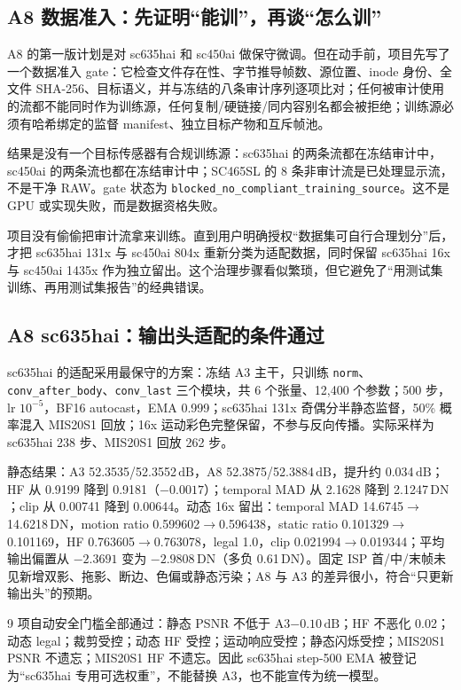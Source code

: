 \documentclass[11pt,a4paper,UTF8,fontset=fandol]{ctexart}
\newcommand{\dn}{\ensuremath{\,\mathrm{DN}}}
\newcommand{\db}{\ensuremath{\,\mathrm{dB}}}
\begin{document}
\subsection{A8 数据准入：先证明“能训”，再谈“怎么训”}

A8 的第一版计划是对 sc635hai 和 sc450ai 做保守微调。但在动手前，项目先写了一个数据准入 gate：它检查文件存在性、字节推导帧数、源位置、inode 身份、全文件 SHA-256、目标语义，并与冻结的八条审计序列逐项比对；任何被审计使用的流都不能同时作为训练源，任何复制/硬链接/同内容别名都会被拒绝；训练源必须有哈希绑定的监督 manifest、独立目标产物和互斥帧池。

结果是没有一个目标传感器有合规训练源：sc635hai 的两条流都在冻结审计中，sc450ai 的两条流也都在冻结审计中；SC465SL 的 8 条非审计流是已处理显示流，不是干净 RAW。gate 状态为 \texttt{blocked\_no\_compliant\_training\_source}。这不是 GPU 或实现失败，而是数据资格失败。

项目没有偷偷把审计流拿来训练。直到用户明确授权“数据集可自行合理划分”后，才把 sc635hai 131x 与 sc450ai 804x 重新分类为适配数据，同时保留 sc635hai 16x 与 sc450ai 1435x 作为独立留出。这个治理步骤看似繁琐，但它避免了“用测试集训练、再用测试集报告”的经典错误。

\subsection{A8 sc635hai：输出头适配的条件通过}

sc635hai 的适配采用最保守的方案：冻结 A3 主干，只训练 \texttt{norm}、\texttt{conv\_after\_body}、\texttt{conv\_last} 三个模块，共 6 个张量、12,400 个参数；500 步，lr $10^{-5}$，BF16 autocast，EMA 0.999；sc635hai 131x 奇偶分半静态监督，50\% 概率混入 MIS20S1 回放；16x 运动彩色完整保留，不参与反向传播。实际采样为 sc635hai 238 步、MIS20S1 回放 262 步。

静态结果：A3 52.3535/52.3552\db，A8 52.3875/52.3884\db，提升约 0.034\db；HF 从 0.9199 降到 0.9181（$-0.0017$）；temporal MAD 从 2.1628 降到 2.1247\dn；clip 从 0.00741 降到 0.00644。动态 16x 留出：temporal MAD 14.6745$\rightarrow$14.6218\dn，motion ratio 0.599602$\rightarrow$0.596438，static ratio 0.101329$\rightarrow$0.101169，HF 0.763605$\rightarrow$0.763078，legal 1.0，clip 0.021994$\rightarrow$0.019344；平均输出偏置从 $-2.3691$ 变为 $-2.9808$\dn（多负 0.61\dn）。固定 ISP 首/中/末帧未见新增双影、拖影、断边、色偏或静态污染；A8 与 A3 的差异很小，符合“只更新输出头”的预期。

9 项自动安全门槛全部通过：静态 PSNR 不低于 A3$-0.10$\db；HF 不恶化 0.02；动态 legal；裁剪受控；动态 HF 受控；运动响应受控；静态闪烁受控；MIS20S1 PSNR 不遗忘；MIS20S1 HF 不遗忘。因此 sc635hai step-500 EMA 被登记为“sc635hai 专用可选权重”，不能替换 A3，也不能宣传为统一模型。
\end{document}
